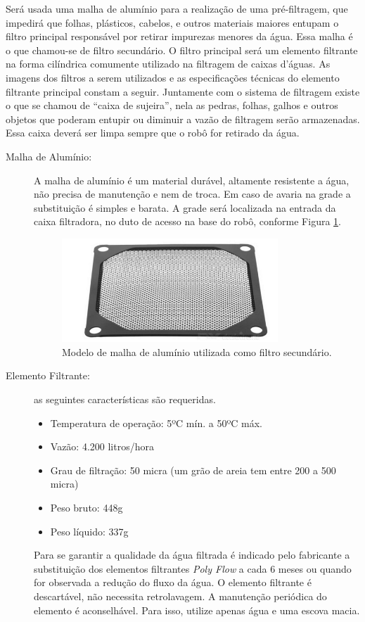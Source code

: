 Será usada uma malha de alumínio para a realização de uma pré-filtragem, que impedirá que folhas, plásticos, cabelos, e outros materiais maiores entupam o filtro principal responsável por retirar impurezas menores da água. Essa malha é o que chamou-se de filtro secundário. O filtro principal será um elemento filtrante na forma cilíndrica comumente utilizado na filtragem de caixas d’águas. As imagens dos filtros a serem utilizados e as especificações técnicas do elemento filtrante principal constam a seguir. Juntamente com o sistema de filtragem existe o que se chamou de “caixa de sujeira”, nela as pedras, folhas, galhos e outros objetos que poderam entupir ou diminuir a vazão de filtragem serão armazenadas. Essa caixa deverá ser limpa sempre que o robô for retirado da água.
\begin{description}
\item[Malha de Alumínio:] A malha de alumínio é um material durável, altamente resistente a água, não precisa de manutenção e nem de troca. Em caso de avaria na grade a substituição é simples e barata. A grade será localizada na entrada da caixa filtradora, no duto de acesso na base do robô, conforme Figura \ref{fig:mesh-aluminium}.
\par
  \begin{figure}[h]
    \centering
    \includegraphics[width=0.8\textwidth]{figures/mesh-aluminium.png}
    \caption{Modelo de malha de alumínio utilizada como filtro secundário. \cite{dx2016}}
    \label{fig:mesh-aluminium}
  \end{figure}
  \FloatBarrier
\par
\item[Elemento Filtrante:] as seguintes características são requeridas.

\begin{itemize}
\item Temperatura de operação: 5ºC mín. a 50ºC máx.
\item Vazão: 4.200 litros/hora
\item Grau de filtração: 50 micra (um grão de areia tem entre 200 a 500 micra)
\item Peso bruto: 448g
\item Peso líquido: 337g
\end{itemize}
Para se garantir a qualidade da água filtrada é indicado pelo fabricante a substituição dos elementos filtrantes \textit{Poly Flow} a cada 6 meses ou quando for observada a redução do fluxo da água. O elemento filtrante é descartável, não necessita retrolavagem. A manutenção periódica do elemento é aconselhável. Para isso, utilize apenas água e uma escova macia.


\end{description}
